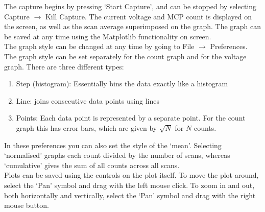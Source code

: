 \documentclass[10pt,a4paper]{article}
\begin{document}
The capture begins by pressing `Start Capture', and can be stopped by selecting Capture $\rightarrow$ Kill Capture. The current voltage and MCP count is displayed on the screen, as well as the scan average superimposed on the graph. The graph can be saved at any time using the Matplotlib functionality on screen. \\

The graph style can be changed at any time by going to File $\rightarrow$ Preferences. The graph style can be set separately for the count graph and for the voltage graph. There are three different types:
\begin{enumerate}
\item Step (histogram): Essentially bins the data exactly like a histogram
\item Line: joins consecutive data points using lines
\item Points: Each data point is represented by a separate point. For the count graph this has error bars, which are given by $\sqrt{N}$ for $N$ counts.
\end{enumerate}

In these preferences you can also set the style of the `mean'. Selecting `normalised' graphs each count divided by the number of scans, whereas `cumulative' gives the sum of all counts across all scans. \\

Plots can be saved using the controls on the plot itself. To move the plot around, select the `Pan' symbol and drag with the left mouse click. To zoom in and out, both horizontally and vertically, select the `Pan' symbol and drag with the right mouse button.
\end{document}
